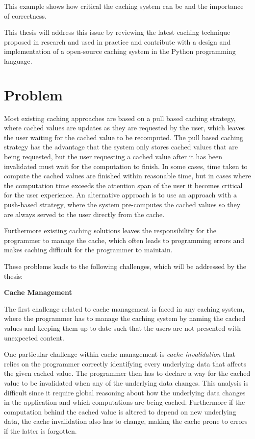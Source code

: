 This example shows how critical the caching system can be and the importance of correctness.

This thesis will address this issue by reviewing the latest caching technique proposed in research and used in practice and contribute with a design and implementation of a open-source caching system in the Python programming language.

\section{Problem}
\label{sec:problem}

Most existing caching approaches are based on a pull based caching strategy, where cached values are updates as they are requested by the user, which leaves the user waiting for the cached value to be recomputed. The pull based caching strategy has the advantage that the system only stores cached values that are being requested, but the user requesting a cached value after it has been invalidated must wait for the computation to finish. In some cases, time taken to compute the cached values are finished within reasonable time, but in cases where the computation time exceeds the attention span of the user it becomes critical for the user experience. An alternative approach is to use an approach with a push-based strategy, where the system pre-computes the cached values so they are always served to the user directly from the cache.

Furthermore existing caching solutions leaves the responsibility for the programmer to manage the cache, which often leads to programming errors and makes caching difficult for the programmer to maintain.

These problems leads to the following challenges, which will be addressed by the thesis:

\textbf{Cache Management}

The first challenge related to cache management is faced in any caching system, where the programmer has to manage the caching system by naming the cached values and keeping them up to date such that the users are not presented with unexpected content.

One particular challenge within cache management is \emph{cache invalidation} that relies on the programmer correctly identifying every underlying data that affects the given cached value. The programmer then has to declare a way for the cached value to be invalidated when any of the underlying data changes. This analysis is difficult since it require global reasoning about how the underlying data changes in the application and which computations are being cached. Furthermore if the computation behind the cached value is altered to depend on new underlying data, the cache invalidation also has to change, making the cache prone to errors if the latter is forgotten.

